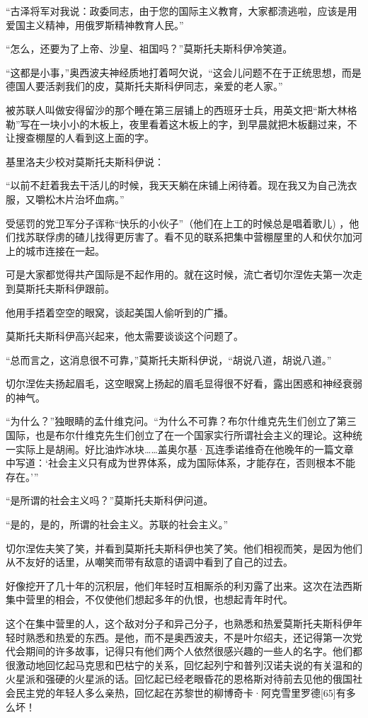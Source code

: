 “古泽将军对我说：政委同志，由于您的国际主义教育，大家都溃逃啦，应该是用爱国主义精神，用俄罗斯精神教育人民。”

“怎么，还要为了上帝、沙皇、祖国吗？”莫斯托夫斯科伊冷笑道。

“这都是小事，”奥西波夫神经质地打着呵欠说，“这会儿问题不在于正统思想，而是德国人要活剥我们的皮，莫斯托夫斯科伊同志，亲爱的老人家。”

被苏联人叫做安得留沙的那个睡在第三层铺上的西班牙士兵，用英文把“斯大林格勒”写在一块小小的木板上，夜里看着这木板上的字，到早晨就把木板翻过来，不让搜查棚屋的人看到这上面的字。

基里洛夫少校对莫斯托夫斯科伊说：

“以前不赶着我去干活儿的时候，我天天躺在床铺上闲待着。现在我又为自己洗衣服，又嚼松木片治坏血病。”

受惩罚的党卫军分子诨称“快乐的小伙子”（他们在上工的时候总是唱着歌儿) ，他们找苏联俘虏的碴儿找得更厉害了。看不见的联系把集中营棚屋里的人和伏尔加河上的城市连接在一起。

可是大家都觉得共产国际是不起作用的。就在这时候，流亡者切尔涅佐夫第一次走到莫斯托夫斯科伊跟前。

他用手捂着空空的眼窝，谈起美国人偷听到的广播。

莫斯托夫斯科伊高兴起来，他太需要谈谈这个问题了。

“总而言之，这消息很不可靠，”莫斯托夫斯科伊说，“胡说八道，胡说八道。”

切尔涅佐夫扬起眉毛，这空眼窝上扬起的眉毛显得很不好看，露出困惑和神经衰弱的神气。

“为什么？”独眼睛的孟什维克问。“为什么不可靠？布尔什维克先生们创立了第三国际，也是布尔什维克先生们创立了在一个国家实行所谓社会主义的理论。这种统一实际上是胡闹。好比油炸冰块……盖奥尔基·瓦连季诺维奇在他晚年的一篇文章中写道：‘社会主义只有成为世界体系，成为国际体系，才能存在，否则根本不能存在。’”

“是所谓的社会主义吗？”莫斯托夫斯科伊问道。

“是的，是的，所谓的社会主义。苏联的社会主义。”

切尔涅佐夫笑了笑，并看到莫斯托夫斯科伊也笑了笑。他们相视而笑，是因为他们从不友好的话里，从嘲笑而带有敌意的语调中看到了自己的过去。

好像挖开了几十年的沉积层，他们年轻时互相厮杀的利刃露了出来。这次在法西斯集中营里的相会，不仅使他们想起多年的仇恨，也想起青年时代。

这个在集中营里的人，这个敌对分子和异己分子，也熟悉和热爱莫斯托夫斯科伊年轻时熟悉和热爱的东西。是他，而不是奥西波夫，不是叶尔绍夫，还记得第一次党代会期间的许多故事，记得只有他们两个人依然很感兴趣的一些人的名字。他们都很激动地回忆起马克思和巴枯宁的关系，回忆起列宁和普列汉诺夫说的有关温和的火星派和强硬的火星派的话。回忆起已经老眼昏花的恩格斯对待前去见他的俄国社会民主党的年轻人多么亲热，回忆起在苏黎世的柳博奇卡·阿克雪里罗德[65]有多么坏！

